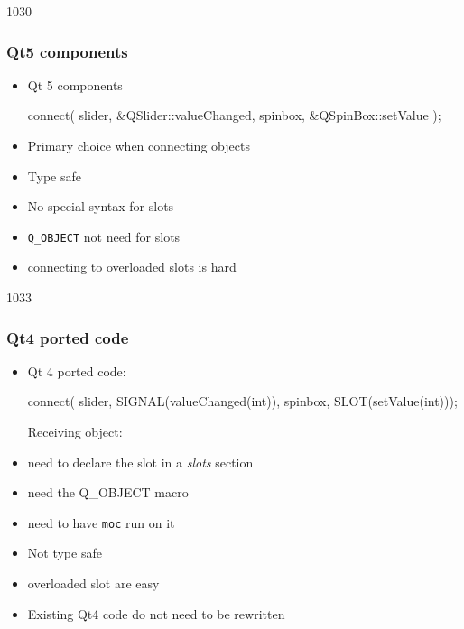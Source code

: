 \newcommand{\advantage}{\hspace{-5mm}\makebox[6mm]{\correct}}
\newcommand{\disadvantage}{\hspace{-5mm}\makebox[6mm]{\incorrect}}
\begin{slide}[fragile]{1030}\frametitle{Qt5 components}
  \begin{itemize}
\item Qt 5 components
\begin{cpp}
connect( slider, &QSlider::valueChanged,
         spinbox, &QSpinBox::setValue );
\end{cpp}\medskip
\item Primary choice when connecting objects\medskip
\item[]\advantage Type safe
\item[]\advantage No special syntax for slots
\item[]\advantage \texttt{Q\_OBJECT} not need for slots
\item[]\disadvantage connecting to overloaded slots is hard
  \end{itemize}
\end{slide}


\begin{slide}[fragile]{1033}\frametitle{Qt4 ported code}
  \begin{itemize}
  \item Qt 4 ported code:\\
\begin{cpp}
connect( slider, SIGNAL(valueChanged(int)), 
         spinbox, SLOT(setValue(int)));
\end{cpp}\medskip
\hspace{-3mm}Receiving object: 
\item[]\disadvantage need to declare the slot in a \textit{slots}
  section
\item[]\disadvantage need the Q\_OBJECT macro
\item[]\disadvantage need to have \texttt{moc} run on it\bigskip

\item[]\disadvantage Not type safe
\item[]\advantage overloaded slot are easy
\item[]\advantage Existing Qt4 code do not need to be rewritten
\end{itemize}
\bigskip\bigskip
\end{slide}


